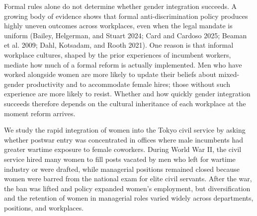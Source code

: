 Formal rules alone do not determine whether gender integration succeeds. A growing body of evidence shows that formal anti-discrimination policy produces highly uneven outcomes across workplaces, even when the legal mandate is uniform (Bailey, Helgerman, and Stuart 2024; Card and Cardoso 2025; Beaman et al. 2009; Dahl, Kotsadam, and Rooth 2021). One reason is that informal workplace cultures, shaped by the prior experiences of incumbent workers, mediate how much of a formal reform is actually implemented. Men who have worked alongside women are more likely to update their beliefs about mixed-gender productivity and to accommodate female hires; those without such experience are more likely to resist. Whether and how quickly gender integration succeeds therefore depends on the cultural inheritance of each workplace at the moment reform arrives.

We study the rapid integration of women into the Tokyo civil service by asking whether postwar entry was concentrated in offices where male incumbents had greater wartime exposure to female coworkers. During World War II, the civil service hired many women to fill posts vacated by men who left for wartime industry or were drafted, while managerial positions remained closed because women were barred from the national exam for elite civil servants. After the war, the ban was lifted and policy expanded women's employment, but diversification and the retention of women in managerial roles varied widely across departments, positions, and workplaces. 

